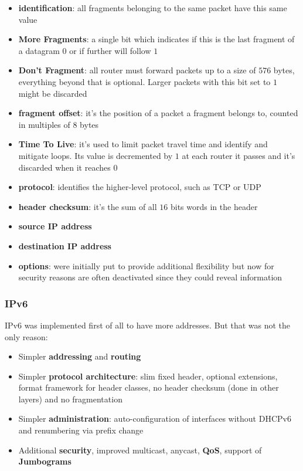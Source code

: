 \begin{itemize}
	\item \textbf{identification}: all fragments belonging to the same packet have this same value
	\item \textbf{More Fragments}: a single bit which indicates if this is the last fragment of a datagram $0$ or if further will follow $1$
	\item \textbf{Don't Fragment}: all router must forward packets up to a size of $576$ bytes, everything beyond that is optional. Larger packets with this bit set to $1$ might be discarded
	\item \textbf{fragment offset}: it's the position of a packet a fragment belongs to, counted in multiples of $8$ bytes
	\item \textbf{Time To Live}: it's used to limit packet travel time and identify and mitigate loops. Its value is decremented by $1$ at each router it passes and it's discarded when it reaches $0$
	\item \textbf{protocol}: identifies the higher-level protocol, such as TCP or UDP
	\item \textbf{header checksum}: it's the sum of all $16$ bits words in the header
	\item \textbf{source IP address}
	\item \textbf{destination IP address}
	\item \textbf{options}: were initially put to provide additional flexibility but now for security reasons are often deactivated since they could reveal information
\end{itemize}

\subsubsection{IPv6}
IPv6 was implemented first of all to have more addresses. But that was not the only reason:
\begin{itemize}
	\item Simpler \textbf{addressing} and \textbf{routing}
	\item Simpler \textbf{protocol architecture}: slim fixed header, optional extensions, format framework for header classes, no header checksum (done in other layers) and no fragmentation
	\item Simpler \textbf{administration}: auto-configuration of interfaces without DHCPv6 and renumbering via prefix change
	\item Additional \textbf{security}, improved multicast, anycast, \textbf{QoS}, support of \textbf{Jumbograms}
\end{itemize}

